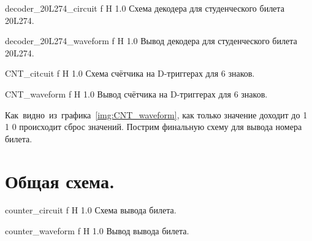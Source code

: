 \documentclass{bmstu}
\begin{document}
	{decoder_20L274_circuit}
	{f} %
	{H} %
	{1.0\textwidth} %
	{Схема декодера для студенческого билета 20L274.} %
	
	{decoder_20L274_waveform}
	{f} %
	{H} %
	{1.0\textwidth} %
	{Вывод декодера для студенческого билета 20L274.} %
	
	{CNT_citcuit}
	{f} %
	{H} %
	{1.0\textwidth} %
	{Схема счётчика на D-триггерах для 6 знаков.} %
	
	{CNT_waveform}
	{f} %
	{H} %
	{1.0\textwidth} %
	{Вывод счётчика на D-триггерах для 6 знаков.} %
	
	\begin{flushleft}
		Как~видно~из~графика~\ref{img:CNT_waveform}, как только значение доходит
		до 1 1 0 происходит сброс значений. Пострим финальную схему для вывода
		номера билета.
	\end{flushleft}
	
	\section{Общая схема.}
	{counter_circuit}
	{f} %
	{H} %
	{1.0\textwidth} %
	{Схема вывода билета.} %
	
	{counter_waveform}
	{f} %
	{H} %
	{1.0\textwidth} %
	{Вывод вывода билета.} %
	
\end{document}
